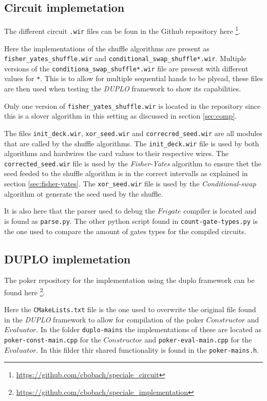 \documentclass[twoside,11pt,openright]{report}
\newcommand{\FY}{\textit{Fisher-Yates} }
\newcommand{\CS}{\textit{Conditional-swap} }
\newcommand{\DUPLO}{\textit{DUPLO} }
\begin{document}
\begin{appendices}
\subsection{Circuit implemetation}
\label{app:circuit-impl}
The different circuit \verb|.wir| files can be foun in the Github repository here \footnote{\url{https://github.com/cbobach/speciale_circuit}}.

Here the implementations of the shuffle algorithms are present as \verb|fisher_yates_shuffle.wir| and \verb|conditional_swap_shuffle*.wir|. Multiple versions of the \verb|conditiona_swap_shuffle*.wir| file are present with different values for \verb|*|. This is to allow for multiple sequential hands to be plyead, these files are then used when testing the \DUPLO framework to show its capabilities.

Only one version of \verb|fisher_yates_shuffle.wir| is located in the repository since this is a slover algorithm in this setting as discussed in section \ref{sec:comp}.

The files \verb|init_deck.wir|, \verb|xor_seed.wir| and \verb|correcred_seed.wir| are all modules that are called by the shuffle algorithms. The \verb|init_deck.wir| file is used by both algorithms and hardwires the card values to their respective wires. The \verb|corrected_seed.wir| file is used by the \FY algorithm to ensure thet the seed feeded to the shuffle algorithm is in the correct intervalls as explained in section \ref{sec:fisher-yates}. The \verb|xor_seed.wir| file is used by the \CS algorithm ot generate the seed used by the shuffle.

\bigskip

It is also here that the parser used to debug the $Frigate$ compiler is located and is found as \verb|parse.py|. The other python script found in \verb|count-gate-types.py| is the one used to compare the amount of gates types for the compiled circuits.


\subsection{DUPLO implemetation}
\label{app:duplo-impl}
The poker repository for the implementation using the duplo framework can be found here \footnote{\url{https://github.com/cbobach/speciale_implementation}}.

Here the \verb|CMakeLists.txt| file is the one used to overwrite the original file found in the \DUPLO framework to allow for compilation of the poker $Constructor$ and $Evaluator$. In the folder \verb|duplo-mains| the implementations of these are located as \verb|poker-const-main.cpp| for the $Constructor$ and \verb|poker-eval-main.cpp| for the $Evaluator$. In this filder thir shared functionality is found in the \verb|poker-mains.h|.


\end{appendices}
\end{document}
